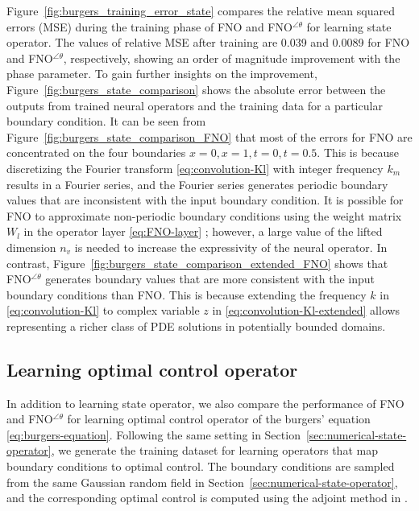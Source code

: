 \documentclass[letterpaper, 10 pt, conference]{ieeeconf}  %
\begin{document}
Figure~\ref{fig:burgers_training_error_state} compares the relative mean squared errors (MSE) during the training phase of FNO and FNO$^{\angle \theta}$ for learning state operator.
The values of relative MSE after training are 0.039 and 0.0089 for FNO and FNO$^{\angle \theta}$, respectively, showing an order of magnitude improvement with the phase parameter.
To gain further insights on the improvement, Figure~\ref{fig:burgers_state_comparison} shows the absolute error between the outputs from trained neural operators and the training data for a particular boundary condition.
It can be seen from Figure~\ref{fig:burgers_state_comparison_FNO} that most of the errors for FNO are concentrated on the four boundaries $x=0, x=1, t=0, t=0.5$.
This is because discretizing the Fourier transform \eqref{eq:convolution-Kl} with integer frequency $k_m$ results in a Fourier series, and the Fourier series generates periodic boundary values that are inconsistent with the input boundary condition.
It is possible for FNO to approximate non-periodic boundary conditions using the weight matrix $W_l$ in the operator layer \eqref{eq:FNO-layer} \cite{li2020fourier}; however, a large value of the lifted dimension $n_v$ is needed to increase the expressivity of the neural operator.
In contrast, Figure~\ref{fig:burgers_state_comparison_extended_FNO} shows that FNO$^{\angle \theta}$ generates boundary values that are more consistent with the input boundary conditions than FNO.
This is because extending the frequency $k$ in \eqref{eq:convolution-Kl} to complex variable $z$ in \eqref{eq:convolution-Kl-extended} allows representing a richer class of PDE solutions in potentially bounded domains.

\subsection{Learning optimal control operator}

In addition to learning state operator, we also compare the performance of FNO and FNO$^{\angle \theta}$ for learning optimal control operator of the burgers' equation \eqref{eq:burgers-equation}.
Following the same setting in Section~\ref{sec:numerical-state-operator}, we generate the training dataset for learning operators that map boundary conditions to optimal control.
The boundary conditions are sampled from the same Gaussian random field in Section~\ref{sec:numerical-state-operator}, and the corresponding optimal control is computed using the adjoint method in \cite{fikl2016comprehensive}.
\end{document}
